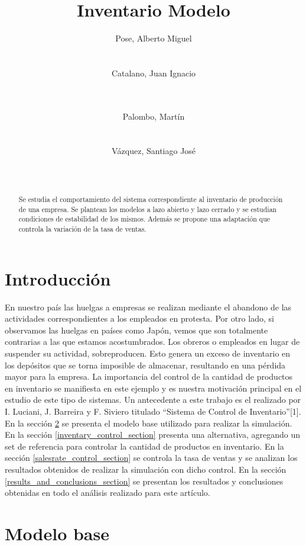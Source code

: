 \documentclass{sig-alternate}
\title{Inventario Modelo}
\author{
\alignauthor
Pose, Alberto Miguel\\
       \affaddr{Instituto Tecnológico de Buenos Aires}\\
       \affaddr{Buenos Aires, Argentina}\\
       \email{apose@alu.itba.edu.ar}
\alignauthor
Catalano, Juan Ignacio\\
       \affaddr{Instituto Tecnológico de Buenos Aires}\\
       \affaddr{Buenos Aires, Argentina}\\
       \email{jcatalan@alu.itba.edu.ar}
\and
\alignauthor 
Palombo, Martín\\
       \affaddr{Instituto Tecnológico de Buenos Aires}\\
       \affaddr{Buenos Aires, Argentina}\\
       \email{mpalombo@alu.itba.edu.ar}
\alignauthor 
Vázquez, Santiago José\\
       \affaddr{Instituto Tecnológico de Buenos Aires}\\
       \affaddr{Buenos Aires, Argentina}\\
       \email{savazque@alu.itba.edu.ar}
}
\date{}
\begin{document}
\maketitle

\begin{abstract}
Se estudia el comportamiento del sistema correspondiente al inventario de producción de una empresa. Se plantean los modelos a lazo abierto y
lazo cerrado y se estudian condiciones de estabilidad de los mismos. Además se propone una adaptación que controla la variación de la tasa
de ventas.
\end{abstract}

\section{Introducción}
En nuestro país las huelgas a empresas se realizan mediante el abandono de las actividades correspondientes a los empleados en protesta. Por otro
lado, si observamos las huelgas en países como Japón, vemos que son totalmente contrarias a las que estamos acostumbrados. Los obreros o empleados
en lugar de suspender su actividad, sobreproducen. Esto genera un exceso de inventario en los depósitos que se torna imposible de almacenar,
resultando en una pérdida mayor para la empresa. La importancia del control de la cantidad de productos en inventario se manifiesta en este
ejemplo y es nuestra motivación principal en el estudio de este tipo de sistemas. Un antecedente a este trabajo es el realizado por I. Luciani, J. Barreira y
F. Siviero titulado ``Sistema de Control de Inventario''[1].\\ 
En la sección \ref{model_section} se presenta el modelo base utilizado para realizar la simulación. En la sección \ref{inventary_control_section} presenta una alternativa, 
agregando un set de referencia para controlar la cantidad de productos en inventario. En la sección \ref{salesrate_control_section} se controla
la tasa de ventas y se analizan los resultados obtenidos de realizar la simulación con dicho control. En la sección \ref{results_and_conclusions_section}
se presentan los resultados y conclusiones obtenidas en todo el análisis realizado para este artículo.

\section{Modelo base}
\label{model_section}
\end{document}
